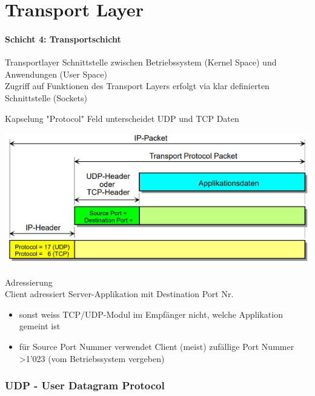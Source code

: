 \section{Transport Layer}
\paragraph{Schicht 4: Transportschicht}


\begin{definition}{Transportlayer}
    Schnittstelle zwischen Betriebssystem (Kernel Space) und Anwendungen (User Space)\\
    Zugriff auf Funktionen des Transport Layers erfolgt via klar definierten Schnittstelle (Sockets)
\end{definition}

\begin{definition}{Kapselung} "Protocol" Feld unterscheidet UDP und TCP Daten
    
    \includegraphics[width=0.9\linewidth]{images/tcp_udp_header.png}
\end{definition}

\begin{concept}{Adressierung}\\
    Client adressiert Server-Applikation mit Destination Port Nr.
    \begin{itemize}
        \item sonst weiss TCP/UDP-Modul im Empfänger nicht, welche Applikation gemeint ist
        \item für Source Port Nummer verwendet Client (meist) zufällige Port Nummer >1'023 (vom Betriebssystem vergeben)
    \end{itemize}
\end{concept}

\subsubsection{UDP - User Datagram Protocol}

